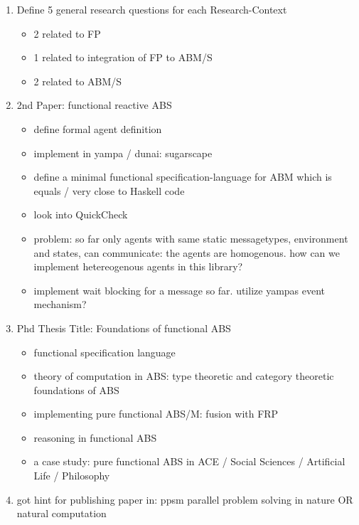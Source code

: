 \begin{enumerate}
\item Define 5 general research questions for each Research-Context
	\begin{itemize}
    \item 2 related to FP
    \item 1 related to integration of FP to ABM/S
    \item 2 related to ABM/S
    \end{itemize}

\item 2nd Paper: functional reactive ABS
	\begin{itemize}
		\item define formal agent definition
		\item implement in yampa / dunai: sugarscape
		\item define a minimal functional specification-language for ABM which is equals / very close to Haskell code 
		\item look into QuickCheck
		\item problem: so far only agents with same static messagetypes, environment and states, can communicate: the agents are homogenous. how can we implement hetereogenous agents in this library?
		\item implement wait blocking for a message so far. utilize yampas event mechanism?
	\end{itemize}

\item Phd Thesis Title: Foundations of functional ABS
	\begin{itemize}
		\item functional specification language
		\item theory of computation in ABS: type theoretic and category theoretic foundations of ABS
		\item implementing pure functional ABS/M: fusion with FRP
		\item reasoning in functional ABS
		\item a case study: pure functional ABS in ACE / Social Sciences / Artificial Life / Philosophy
	\end{itemize}

\item got hint for publishing paper in: ppsm parallel problem solving in nature OR natural computation

\end{enumerate}